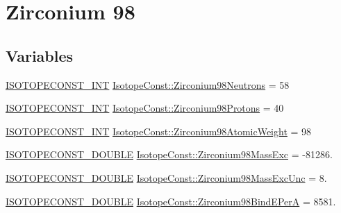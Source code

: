 \hypertarget{group___isotope_const-_zirconium-_zr98}{}\section{Zirconium 98}
\label{group___isotope_const-_zirconium-_zr98}
\subsection*{Variables}
\begin{DoxyCompactItemize}
\item 
\mbox{\hyperlink{group___isotope_const-_macros_ga5f18360b3e99483a35c32d789e62621c}{I\+S\+O\+T\+O\+P\+E\+C\+O\+N\+S\+T\+\_\+\+I\+NT}} \mbox{\hyperlink{group___isotope_const-_zirconium-_zr98_ga2a2c4dcb098d6e4d77ce27ebd95af96d}{Isotope\+Const\+::\+Zirconium98\+Neutrons}} = 58
\item 
\mbox{\hyperlink{group___isotope_const-_macros_ga5f18360b3e99483a35c32d789e62621c}{I\+S\+O\+T\+O\+P\+E\+C\+O\+N\+S\+T\+\_\+\+I\+NT}} \mbox{\hyperlink{group___isotope_const-_zirconium-_zr98_ga3eb36796229df22fbcd07d39f53af52a}{Isotope\+Const\+::\+Zirconium98\+Protons}} = 40
\item 
\mbox{\hyperlink{group___isotope_const-_macros_ga5f18360b3e99483a35c32d789e62621c}{I\+S\+O\+T\+O\+P\+E\+C\+O\+N\+S\+T\+\_\+\+I\+NT}} \mbox{\hyperlink{group___isotope_const-_zirconium-_zr98_gadbd544c54c41fcd06b6ffdb3788e5f24}{Isotope\+Const\+::\+Zirconium98\+Atomic\+Weight}} = 98
\item 
\mbox{\hyperlink{group___isotope_const-_macros_ga8f45a7272ce02c0b4c65c44636ed719a}{I\+S\+O\+T\+O\+P\+E\+C\+O\+N\+S\+T\+\_\+\+D\+O\+U\+B\+LE}} \mbox{\hyperlink{group___isotope_const-_zirconium-_zr98_ga915a3751bcc6f759d6a0c49bf9afd00e}{Isotope\+Const\+::\+Zirconium98\+Mass\+Exc}} = -\/81286.
\item 
\mbox{\hyperlink{group___isotope_const-_macros_ga8f45a7272ce02c0b4c65c44636ed719a}{I\+S\+O\+T\+O\+P\+E\+C\+O\+N\+S\+T\+\_\+\+D\+O\+U\+B\+LE}} \mbox{\hyperlink{group___isotope_const-_zirconium-_zr98_gae867725088320e5845fd8930856f1c7d}{Isotope\+Const\+::\+Zirconium98\+Mass\+Exc\+Unc}} = 8.
\item 
\mbox{\hyperlink{group___isotope_const-_macros_ga8f45a7272ce02c0b4c65c44636ed719a}{I\+S\+O\+T\+O\+P\+E\+C\+O\+N\+S\+T\+\_\+\+D\+O\+U\+B\+LE}} \mbox{\hyperlink{group___isotope_const-_zirconium-_zr98_ga39caa8e9a1e6456b32e9372370e3f4d3}{Isotope\+Const\+::\+Zirconium98\+Bind\+E\+PerA}} = 8581.
\item 

\end{DoxyCompactItemize}

